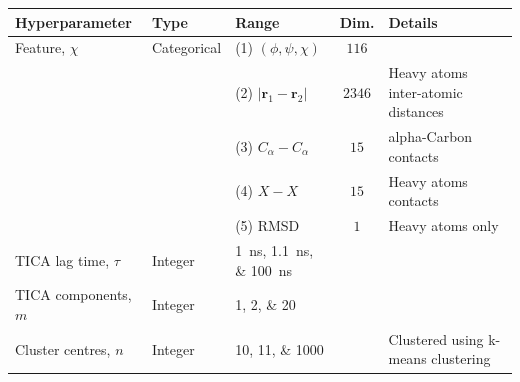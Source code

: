 \begin{table}
    \centering
    \begin{tabularx}{0.9\textwidth}{ |>{\raggedright\arraybackslash}l|l|>{\raggedright\arraybackslash}X|c| >{\raggedright\arraybackslash}X | } 
    \hline
    \textbf{Hyperparameter} & \textbf{Type} & \textbf{Range} & \textbf{Dim.} &\textbf{Details} \\
     \hline\hline
    Feature, $\chi$ & Categorical & (1) $(\phi, \psi, \chi)$ & $\num{116}$  & \\
    & & (2) $|\mathbf{r}_{1}-\mathbf{r}_{2}|$  & $\num{ 2346}$& Heavy atoms inter-atomic distances \\
    & & (3) $C_{\alpha}-C_{\alpha}$ & $\num{15}$ & alpha-Carbon contacts\\ 
    & & (4) $X-X$  & $\num{15}$ & Heavy atoms contacts\\ 
    & & (5) RMSD & $\num{1}$ &  Heavy atoms only\\ 
    \hline
    TICA lag time, $\tau$ & Integer &\SIlist[list-final-separator = { ... }]{1;1.1;100}{ns} &  & \\
    \hline
    TICA components, $m$& Integer &\numlist[list-final-separator = { ... }]{1;2;20} & & \\
    \hline
    Cluster centres, $n$ & Integer & \numlist[list-final-separator = { ... }]{10;11;1000}& &  Clustered using k-means clustering  \\
    
     \hline
    \end{tabularx}
    \label{tab:aadh_searchspace}
\end{table}

